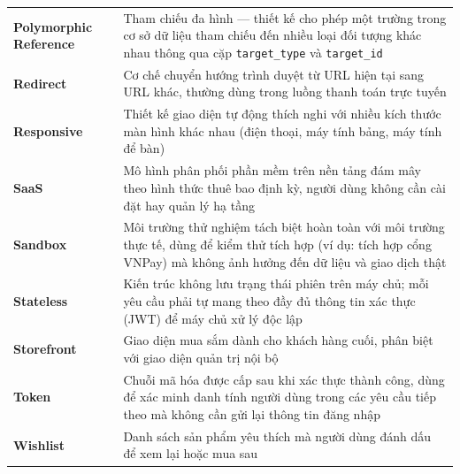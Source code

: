 \documentclass[../DoAn.tex]{subfiles}
\begin{document}
\begin{longtable}{l p{14cm}}
	\textbf{Polymorphic Reference} & Tham chiếu đa hình — thiết kế cho phép một trường trong cơ sở dữ liệu tham chiếu đến nhiều loại đối tượng khác nhau thông qua cặp \texttt{target\_type} và \texttt{target\_id} \\
	\textbf{Redirect} & Cơ chế chuyển hướng trình duyệt từ URL hiện tại sang URL khác, thường dùng trong luồng thanh toán trực tuyến \\
	\textbf{Responsive} & Thiết kế giao diện tự động thích nghi với nhiều kích thước màn hình khác nhau (điện thoại, máy tính bảng, máy tính để bàn) \\
	\textbf{SaaS} & Mô hình phân phối phần mềm trên nền tảng đám mây theo hình thức thuê bao định kỳ, người dùng không cần cài đặt hay quản lý hạ tầng \\
	\textbf{Sandbox} & Môi trường thử nghiệm tách biệt hoàn toàn với môi trường thực tế, dùng để kiểm thử tích hợp (ví dụ: tích hợp cổng VNPay) mà không ảnh hưởng đến dữ liệu và giao dịch thật \\
	\textbf{Stateless} & Kiến trúc không lưu trạng thái phiên trên máy chủ; mỗi yêu cầu phải tự mang theo đầy đủ thông tin xác thực (JWT) để máy chủ xử lý độc lập \\
	\textbf{Storefront} & Giao diện mua sắm dành cho khách hàng cuối, phân biệt với giao diện quản trị nội bộ \\
	\textbf{Token} & Chuỗi mã hóa được cấp sau khi xác thực thành công, dùng để xác minh danh tính người dùng trong các yêu cầu tiếp theo mà không cần gửi lại thông tin đăng nhập \\
	\textbf{Wishlist} & Danh sách sản phẩm yêu thích mà người dùng đánh dấu để xem lại hoặc mua sau \\

    \hline
\end{longtable}
\end{document}
